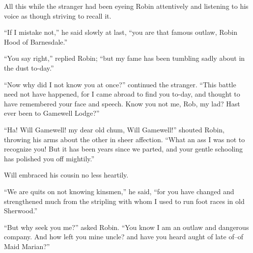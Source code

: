 All this while the stranger had been eyeing Robin attentively and
listening to his voice as though striving to recall it.

``If I mistake not,'' he said slowly at last, ``you are that famous
outlaw, Robin Hood of Barnesdale.''

``You say right,'' replied Robin; ``but my fame has been tumbling sadly
about in the dust to-day.''

``Now why did I not know you at once?'' continued the stranger. ``This
battle need not have happened, for I came abroad to find you to-day, and
thought to have remembered your face and speech. Know you not me, Rob,
my lad? Hast ever been to Gamewell Lodge?''

``Ha! Will Gamewell! my dear old chum, Will Gamewell!'' shouted Robin,
throwing his arms about the other in sheer affection. ``What an ass I
was not to recognize you! But it has been years since we parted, and
your gentle schooling has polished you off mightily.''

Will embraced his cousin no less heartily.

``We are quits on not knowing kinsmen,'' he said, ``for you have changed
and strengthened much from the stripling with whom I used to run foot
races in old Sherwood.''

``But why seek you me?'' asked Robin. ``You know I am an outlaw and
dangerous company. And how left you mine uncle? and have you heard aught
of late of--of Maid Marian?''

